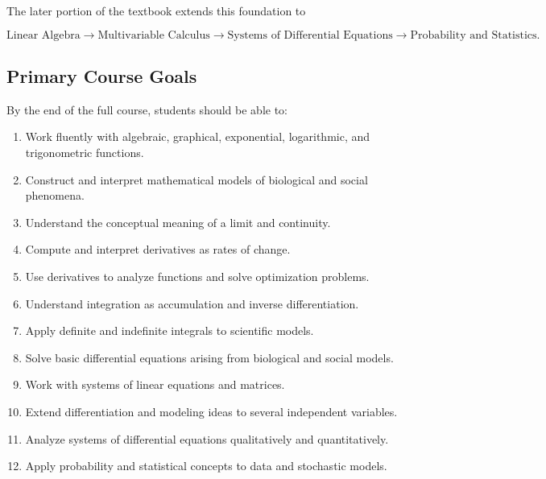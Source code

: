 \documentclass[11pt]{article}
\begin{document}
The later portion of the textbook extends this foundation to

\[
\boxed{
\text{Linear Algebra}
\rightarrow
\text{Multivariable Calculus}
\rightarrow
\text{Systems of Differential Equations}
\rightarrow
\text{Probability and Statistics}.
}
\]

\subsection{Primary Course Goals}

By the end of the full course, students should be able to:

\begin{enumerate}
    \item Work fluently with algebraic, graphical, exponential,
    logarithmic, and trigonometric functions.
    
    \item Construct and interpret mathematical models of biological
    and social phenomena.
    
    \item Understand the conceptual meaning of a limit and continuity.
    
    \item Compute and interpret derivatives as rates of change.
    
    \item Use derivatives to analyze functions and solve optimization
    problems.
    
    \item Understand integration as accumulation and inverse
    differentiation.
    
    \item Apply definite and indefinite integrals to scientific models.
    
    \item Solve basic differential equations arising from biological
    and social models.
    
    \item Work with systems of linear equations and matrices.
    
    \item Extend differentiation and modeling ideas to several
    independent variables.
    
    \item Analyze systems of differential equations qualitatively
    and quantitatively.
    
    \item Apply probability and statistical concepts to data and
    stochastic models.
\end{enumerate}
\end{document}

